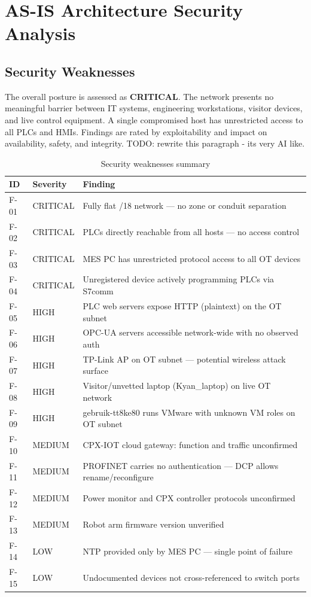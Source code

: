 \documentclass[11pt,a4paper]{article}
\begin{document}
\pagebreak

\section{AS-IS Architecture Security Analysis}

\subsection{Security Weaknesses}
The overall posture is assessed as \textbf{CRITICAL}. The network presents no
meaningful barrier between IT systems, engineering workstations, visitor
devices, and live control equipment. A single compromised host has unrestricted
access to all PLCs and HMIs. Findings are rated by exploitability and impact on
availability, safety, and integrity.
TODO: rewrite this paragraph - its very AI like.

\begin{longtable}{L{1.3cm} L{1.8cm} L{12.0cm}}
\caption{Security weaknesses summary}\\
\toprule
\textbf{ID} & \textbf{Severity} & \textbf{Finding} \\
\midrule \endhead
F-01 & CRITICAL & Fully flat /18 network --- no zone or conduit separation \\
F-02 & CRITICAL & PLCs directly reachable from all hosts --- no access control \\
F-03 & CRITICAL & MES PC has unrestricted protocol access to all OT devices \\
F-04 & CRITICAL & Unregistered device actively programming PLCs via S7comm \\
F-05 & HIGH & PLC web servers expose HTTP (plaintext) on the OT subnet \\
F-06 & HIGH & OPC-UA servers accessible network-wide with no observed auth \\
F-07 & HIGH & TP-Link AP on OT subnet --- potential wireless attack surface \\
F-08 & HIGH & Visitor/unvetted laptop (Kyan\_laptop) on live OT network \\
F-09 & HIGH & gebruik-tt8ke80 runs VMware with unknown VM roles on OT subnet \\
F-10 & MEDIUM & CPX-IOT cloud gateway: function and traffic unconfirmed \\
F-11 & MEDIUM & PROFINET carries no authentication --- DCP allows rename/reconfigure \\
F-12 & MEDIUM & Power monitor and CPX controller protocols unconfirmed \\
F-13 & MEDIUM & Robot arm firmware version unverified \\
F-14 & LOW & NTP provided only by MES PC --- single point of failure \\
F-15 & LOW & Undocumented devices not cross-referenced to switch ports \\
\bottomrule
\end{longtable}
\end{document}
